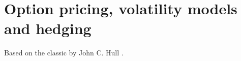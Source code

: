 \chapter{Option pricing, volatility models and hedging}\label{legacy:volatility-options}

Based on the classic by John C. Hull \citep{s7-hulloptions}.



\newpage



